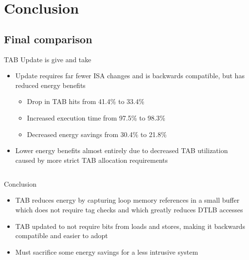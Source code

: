\documentclass{beamer}
\begin{document}
\section{Conclusion}
\subsection{Final comparison}
\begin{frame}{TAB Update is give and take}
   \begin{itemize}
      \item Update requires far fewer ISA changes and is backwards compatible, but
         has reduced energy benefits
         \begin{itemize}
            \item Drop in TAB hits from 41.4\% to 33.4\%
            \item Increased execution time from 97.5\% to 98.3\%
            \item Decreased energy savings from 30.4\% to 21.8\%
         \end{itemize}
      \item Lower energy benefits almost entirely due to decreased TAB utilization
         caused by more strict TAB allocation requirements
   \end{itemize}
\end{frame}
\subsection{}
\begin{frame}{Conclusion}
   \begin{itemize}
      \item TAB reduces energy by capturing loop memory references in a small buffer
         which does not require tag checks and which greatly reduces DTLB accesses
      \item TAB updated to not require bits from loads and stores, making 
         it backwards compatible and easier to adopt
      \item Must sacrifice some energy savings for a less intrusive system
   \end{itemize}
\end{frame}
\end{document}
